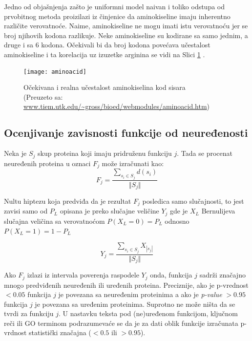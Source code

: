 Jedno od objašnjenja zašto je uniformni model naivan i toliko odstupa od
prvobitnog metoda proizilazi iz činjenice da aminokiseline imaju inherentno
različite verovatnoće. Naime, aminokiseline ne mogu  imati istu
verovatnoću jer se  broj njihovih kodona razlikuje. Neke aminokiseline
su kodirane sa samo jednim, a druge i sa 6 kodona. Očekivali bi da broj kodona
povećava učestalost aminokiseline i ta korelacija uz izuzetke arginina se vidi
na Slici \ref{fig:aminoacid} \parencite{AKfrekvencija}.

\begin{figure}[th]
\centering
\texttt{[image: aminoacid]}
\decoRule
\caption{Očekivana i realna učestalost  aminokiselina kod sisara\\ \footnotesize
(Preuzeto sa: \url{www.tiem.utk.edu/~gross/bioed/webmodules/aminoacid.htm})}
\label{fig:aminoacid}
\end{figure}



\subsection{Ocenjivanje zavisnosti funkcije od neuređenosti}

Neka je $S_j$ skup proteina koji imaju pridruženu funkciju $j$. Tada se procenat
neuređenih proteina u oznaci $F_j$ može izračunati kao:
$$F_j = \dfrac{\sum_{s_i \in S_j} d(s_i)} {\Vert S_j \Vert} $$

Nultu hiptezu koja predviđa da je rezultat $F_j$ posledica samo slučajnosti, to
jest zavisi samo od $P_L$ opisana je preko slučajne veličine $Y_j$ gde je $X_L$
Bernulijeva slučajna veličina sa verovatnoćom $P(X_L = 0) = P_L$ odnosno $P(X_L
= 1) = 1-P_L$

$$ Y_j = \dfrac {\sum_{s_i \in S_j} {X_{|s_j|}}}{\Vert S_j \Vert}$$

Ako $F_j$ izlazi iz intervala poverenja raspodele $Y_j$ onda, funkcija $j$
sadrži značajno mnogo predviđenih neuređenih ili uređenih proteina. Preciznije,
ako je p-vrednost  $<0.05$ funkcija $j$ je povezana sa neuređenim
proteinima a ako je \textit{p-value} $>0.95$ funkcija $j$ je povezana sa
uređenim proteinima. Suprotno ne može ništa da se tvrdi za funkciju $j$.  U
nastavku teksta pod (ne)uređenom funkcijom, ključnom reči  ili GO terminom
podrazumevaće se da je za dati oblik funkcije izračunata p-vrdnost statistički
značajna ($<0.5$ ili $>0.95$).

